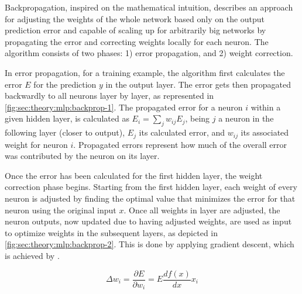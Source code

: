 Backpropagation, inspired on the mathematical intuition, describes an approach for adjusting the weights of the whole network based only on the output prediction error and capable of scaling up for arbitrarily big networks by propagating the error and correcting weights locally for each neuron.
The algorithm consists of two phases: 1) error propagation, and 2) weight correction.

In error propagation, for a training example, the algorithm first calculates the error $E$ for the prediction $y$ in the output layer.
The error gets then propagated backwardly to all neurons layer by layer, as represented in \autoref{fig:sec:theory:mlp:backprop-1}.
The propagated error for a neuron $i$ within a given hidden layer, is calculated as $E_{i} = \sum_j w_{ij} E_{j}$, being $j$ a neuron in the following layer (closer to output), $E_{j}$ its calculated error, and $w_{ij}$ its associated weight for neuron $i$.
Propagated errors represent how much of the overall error was contributed by the neuron on its layer.

Once the error has been calculated for the first hidden layer, the weight correction phase begins.
Starting from the first hidden layer, each weight of every neuron is adjusted by finding the optimal value that minimizes the error for that neuron using the original input $x$.
Once all weights in layer are adjusted, the neuron outputs, now updated due to having adjusted weights, are used as input to optimize weights in the subsequent layers, as depicted in \autoref{fig:sec:theory:mlp:backprop-2}.
This is done by applying gradient descent, which is achieved by .

$$\Delta w_i = \frac{\partial E}{\partial w_i} = E \frac{df(x)}{dx}x_i$$

